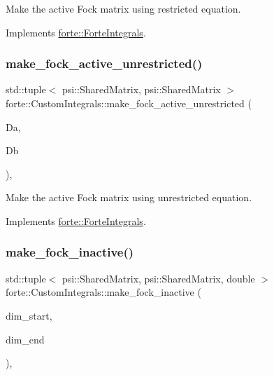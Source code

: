 Make the active Fock matrix using restricted equation. 



Implements \mbox{\hyperlink{classforte_1_1_forte_integrals_a9e2f6f24d734aa04784dfc46d3f031ae}{forte\+::\+Forte\+Integrals}}.

\mbox{\label{classforte_1_1_custom_integrals_a87a7d17ddd89c004adf56b032d409669}} 
\subsubsection{\texorpdfstring{make\+\_\+fock\+\_\+active\+\_\+unrestricted()}{make\_fock\_active\_unrestricted()}}
{\footnotesize\ttfamily std\+::tuple$<$ psi\+::\+Shared\+Matrix, psi\+::\+Shared\+Matrix $>$ forte\+::\+Custom\+Integrals\+::make\+\_\+fock\+\_\+active\+\_\+unrestricted (\begin{DoxyParamCaption}\item[{psi\+::\+Shared\+Matrix}]{Da,  }\item[{psi\+::\+Shared\+Matrix}]{Db }\end{DoxyParamCaption})\hspace{0.3cm}{\ttfamily [override]}, {\ttfamily [virtual]}}



Make the active Fock matrix using unrestricted equation. 



Implements \mbox{\hyperlink{classforte_1_1_forte_integrals_a3bc94f56104d72581629d9d6a6a3a74c}{forte\+::\+Forte\+Integrals}}.

\mbox{\label{classforte_1_1_custom_integrals_a00921e140fba2f63eb8399003029ad1a}} 
\subsubsection{\texorpdfstring{make\+\_\+fock\+\_\+inactive()}{make\_fock\_inactive()}}
{\footnotesize\ttfamily std\+::tuple$<$ psi\+::\+Shared\+Matrix, psi\+::\+Shared\+Matrix, double $>$ forte\+::\+Custom\+Integrals\+::make\+\_\+fock\+\_\+inactive (\begin{DoxyParamCaption}\item[{psi\+::\+Dimension}]{dim\+\_\+start,  }\item[{psi\+::\+Dimension}]{dim\+\_\+end }\end{DoxyParamCaption})\hspace{0.3cm}{\ttfamily [override]}, {\ttfamily [virtual]}}




